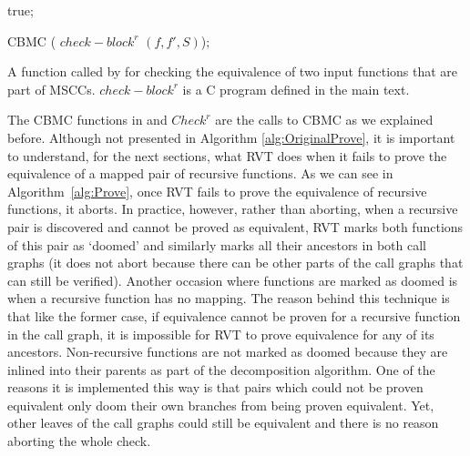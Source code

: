 \begin{algorithm}
\begin{algorithmic}[1]


 true; \EndIf

 CBMC ( $check-block^r$  $(f,f',S)$); \EndFunction
\end{algorithmic}
\caption{A function called by  for checking the equivalence of two input functions that are part of MSCCs. $check-block^r$ is a C program defined in the main text.}
\label{alg:Checkr}
\end{algorithm}


The CBMC functions in  and $Check^r$ are the calls to CBMC as we explained before.
Although not presented in Algorithm \ref{alg:OriginalProve}, it is important to understand, for the next sections, what RVT does when it fails to prove the equivalence of a mapped pair of recursive functions. As we can see in Algorithm~\ref{alg:Prove}, once RVT fails to prove the equivalence of recursive functions, it aborts. In practice, however, rather than aborting, when a recursive pair is discovered and cannot be proved as equivalent, RVT marks both functions of this pair as `doomed' and similarly marks all their ancestors in both call graphs (it does not abort because there can be other parts of the call graphs that can still be verified). Another occasion where functions are marked as doomed is when a recursive function has no mapping. The reason behind this technique is that like the former case, if equivalence cannot be proven for a recursive function in the call graph, it is impossible for RVT to prove equivalence for any of its ancestors. Non-recursive functions are not marked as doomed because they are inlined into their parents as part of the decomposition algorithm. One of the reasons it is implemented this way is that pairs which could not be proven equivalent only doom their own branches from being proven equivalent. Yet, other leaves of the call graphs could still be equivalent and there is no reason aborting the whole check. 
